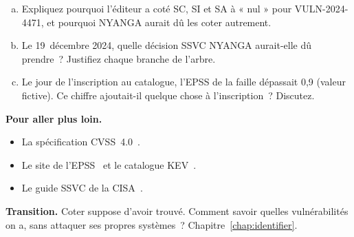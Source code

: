 \begin{boxexo}[title={\ding{45}\quad Exercice~9.4. Le contexte de NYANGA \niveauexpert}]
\begin{enumerate}[(a)]
    \item Expliquez pourquoi l'éditeur a coté SC, SI et SA à « nul » pour
          VULN-2024-4471, et pourquoi NYANGA aurait dû les coter
          autrement.
    \item Le 19~décembre 2024, quelle décision SSVC NYANGA aurait-elle dû
          prendre~? Justifiez chaque branche de l'arbre.
    \item Le jour de l'inscription au catalogue, l'EPSS de la faille
          dépassait 0,9 (valeur fictive). Ce chiffre ajoutait-il quelque
          chose à l'inscription~? Discutez.
\end{enumerate}
\end{boxexo}

\bigskip

\begin{boxinfo}
\textbf{Pour aller plus loin.}
\begin{itemize}
    \item La spécification CVSS~4.0~\cite{first2023cvss4}.
    \item Le site de l'EPSS~\cite{firstepss} et le catalogue
          KEV~\cite{cisakev}.
    \item Le guide SSVC de la CISA~\cite{cisa2022ssvc}.
\end{itemize}
\end{boxinfo}

\begin{boxinfo}
\textbf{Transition.} Coter suppose d'avoir trouvé. Comment savoir quelles
vulnérabilités on a, sans attaquer ses propres systèmes~?
Chapitre~\ref{chap:identifier}.
\end{boxinfo}
